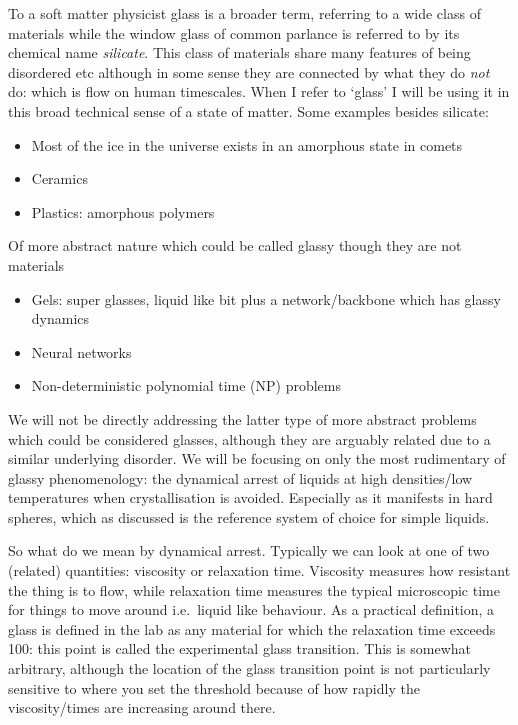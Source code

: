 \documentclass[11pt,twoside]{report}
\begin{document}
To a soft matter physicist glass is a broader term, referring to a wide class of materials while the window glass of common parlance is referred to by its chemical name \emph{silicate}.
This class of materials share many features of being disordered etc \cite{?} although in some sense they are connected by what they do \emph{not} do: which is flow on human timescales.
When I refer to `glass' I will be using it in this broad technical sense of a state of matter.
Some examples besides silicate:
\begin{itemize}
\item Most of the ice in the universe exists in an amorphous state in comets \cite{?}
\item Ceramics
\item Plastics: amorphous polymers
\end{itemize}
Of more abstract nature which could be called glassy though they are not materials
\begin{itemize}
\item Gels: super glasses, liquid like bit plus a network/backbone which has glassy dynamics
\item Neural networks
\item Non-deterministic polynomial time (NP) problems
\end{itemize}
We will not be directly addressing the latter type of more abstract problems which could be considered glasses, although they are arguably related due to a similar underlying disorder.
We will be focusing on only the most rudimentary of glassy phenomenology: the dynamical arrest of liquids at high densities/low temperatures when crystallisation is avoided.
Especially as it manifests in hard spheres, which as discussed is the reference system of choice for simple liquids.

So what do we mean by dynamical arrest.
Typically we can look at one of two (related) quantities: viscosity or relaxation time.
Viscosity measures how resistant the thing is to flow, while relaxation time measures the typical microscopic time for things to move around i.e.\ liquid like behaviour.
As a practical definition, a glass is defined in the lab as any material for which the relaxation time exceeds 100: this point is called the experimental glass transition.
This is somewhat arbitrary, although the location of the glass transition point is not particularly sensitive to where you set the threshold because of how rapidly the viscosity/times are increasing around there.
\end{document}
